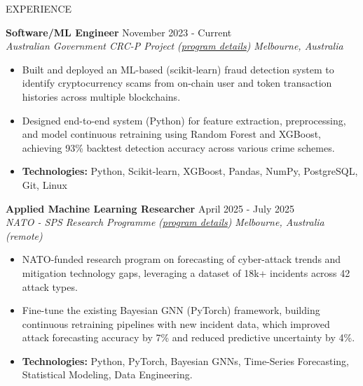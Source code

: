 \documentclass{resume}
\begin{document}
\begin{rSection}{EXPERIENCE}

{{\textbf{Software/ML Engineer}} \hfill {November 2023 - Current}}\\
\vspace{-5pt}
{\textit{Australian Government CRC-P Project} {\em ({\href{https://www.cooperativeresearch.org.au/resources/industry-research-grants/crc-p-grants/}{program details}})} \hfill {\em Melbourne, Australia}}
\begin{itemize}[label=·]
    \item Built and deployed an ML-based (scikit-learn) fraud detection system to identify cryptocurrency scams from on-chain user and token transaction histories across multiple blockchains.
    \vspace{-5pt}
    \item Designed end-to-end system (Python) for feature extraction, preprocessing, and model continuous retraining using Random Forest and XGBoost, achieving 93\% backtest detection accuracy across various crime schemes.
    \vspace{-5pt}
    \item \textbf{Technologies:} Python, Scikit-learn, XGBoost, Pandas, NumPy, PostgreSQL, Git, Linux

\end{itemize}

{\textbf{Applied Machine Learning Researcher}} \hfill {April 2025 - July 2025}\\
\vspace{-5pt}
\textit{NATO - SPS Research Programme} {\em ({\href{https://www.nato.int/cps/en/natohq/topics_85373.htm}{program details}})} \hfill {\em Melbourne, Australia (remote)}
\begin{itemize}[label=·]
    \item NATO-funded research program on forecasting of cyber-attack trends and mitigation technology gaps, leveraging a dataset of 18k+ incidents across 42 attack types.
    \vspace{-5pt}
    \item Fine-tune the existing Bayesian GNN (PyTorch) framework, building continuous retraining pipelines with new incident data, which improved attack forecasting accuracy by 7\% and reduced predictive uncertainty by 4\%.
    \vspace{-5pt}
    \item \textbf{Technologies:} Python, PyTorch, Bayesian GNNs, Time-Series Forecasting, Statistical Modeling, Data Engineering.
\end{itemize}


\end{rSection}
\end{document}
